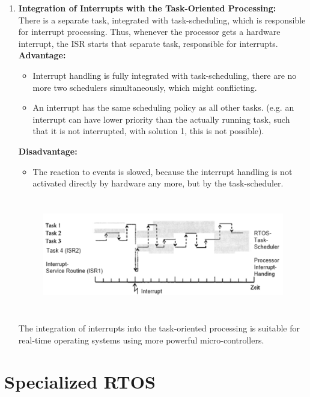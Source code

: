 \begin{enumerate}
\item {\rot\bf Integration of Interrupts with the Task-Oriented Processing: }\\

There is a separate task, integrated with task-scheduling, which is responsible for interrupt processing. Thus, whenever the processor gets a hardware interrupt, the ISR starts that separate task, responsible for interrupts.\\

\textbf{Advantage: }

\begin{itemize}
	\item Interrupt handling is fully integrated with task-scheduling,   there are no more two schedulers simultaneously, which might conflicting.
	\item An interrupt has the same scheduling policy as all other tasks.   (e.g. an interrupt can have lower priority than the actually running task, such that it   is not interrupted, with solution 1, this is not possible).
\end{itemize}  
\newpage
\textbf{Disadvantage: } 

\begin{itemize}
	\item The reaction to events is slowed, because the interrupt handling is not activated   directly by hardware any more, but by the task-scheduler.
\end{itemize} 

 	\begin{figure}[h]
    \centering
    \includegraphics[width=14cm, height=5cm]{Images/image23.png}
    \label{fig:Fig }
    \end{figure}

The integration of interrupts into the task-oriented processing is suitable for real-time operating systems using more powerful micro-controllers.
\end{enumerate}
\newpage

\section{Specialized RTOS}


